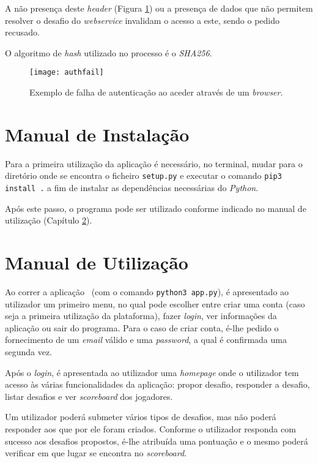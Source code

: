 A não presença deste \textit{header} (Figura \ref{fig::auth-fail}) ou a presença de dados que não permitem resolver o desafio do \textit{webservice} invalidam o acesso a este, sendo o pedido recusado.

O algoritmo de \textit{hash} utilizado no processo é o \textit{SHA256}.

\begin{figure}[!htbp]
    \centering
    \texttt{[image: authfail]}
    \caption[Falha de autenticação]{Exemplo de falha de autenticação ao aceder através de um \textit{browser}.}
    \label{fig::auth-fail}
\end{figure}



\section{Manual de Instalação}
\label{sec::implementacao:maninstall}

Para a primeira utilização da aplicação é necessário, no terminal, mudar para o diretório onde se encontra o ficheiro \verb|setup.py| e executar o comando \verb|pip3 install .| a fim de instalar as dependências necessárias do \textit{Python}.

Após este passo, o programa pode ser utilizado conforme indicado no manual de utilização (Capítulo \ref{sec::implementacao:manuser}).


\section{Manual de Utilização}
\label{sec::implementacao:manuser}

Ao correr a aplicação \appname~(com o comando \verb|python3 app.py|), é apresentado ao utilizador um primeiro menu, no qual pode escolher entre criar uma conta (caso seja a primeira utilização da plataforma), fazer \textit{login}, ver informações da aplicação ou sair do programa.  Para o caso de criar conta, é-lhe pedido o fornecimento de um \textit{email} válido e uma \textit{password}, a qual é confirmada uma segunda vez.

Após o \textit{login}, é apresentada ao utilizador uma \textit{homepage} onde o utilizador tem acesso às várias funcionalidades da aplicação: propor desafio, responder a desafio, listar desafios e ver \textit{scoreboard} dos jogadores.

Um utilizador poderá submeter vários tipos de desafios, mas não poderá responder aos que por ele foram criados. Conforme o utilizador responda com sucesso aos desafios propostos, é-lhe atribuída uma pontuação e o mesmo poderá verificar em que lugar se encontra no \textit{scoreboard}.

